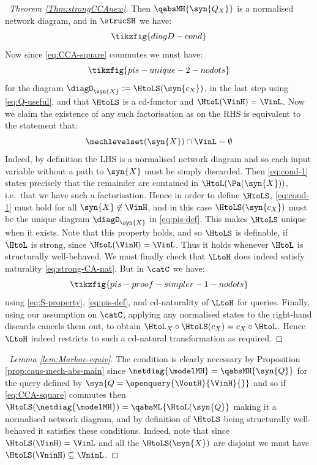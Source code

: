 \documentclass{article}
\begin{document}
{\begin{proof}[\proofof~Theorem \ref{Thm:strongCCAnew}]
Then $\qabsMH{\syn{Q_X}}$ is a normalised network diagram, and in $\strucSH$ we have: 
\begin{equation} \label{eq:S-property}
\tikzfig{diagD-cond}
\end{equation}
Now since \eqref{eq:CCA-square} commutes we must have: 
\begin{equation} \label{eq:pis-def}
\tikzfig{pis-unique-2-nodots}
\end{equation}
for the diagram $\diagD_\syn{X} := \HtoLS(\syn{c_X})$, in the last step using \eqref{eq:Q-useful}, and that $\HtoLS$ is a cd-functor and $\HtoL(\VinH) = \VinL$. Now we claim the existence of any such factorisation as on the RHS is equivalent to the statement that: 
\begin{equation} \label{eq:cond-1}
\mechlevelset(\syn{X}) \cap \VinL = \emptyset 
\end{equation}
Indeed, by definition the LHS is a normalised network diagram and so each input variable without a path to $\syn{X}$ must be simply discarded. Then \eqref{eq:cond-1} states precisely that the remainder are contained in $\HtoL(\Pa(\syn{X}))$, i.e.~that we have such a factorisation. Hence in order to define $\HtoLS$, \eqref{eq:cond-1} must hold for all $\syn{X} \not \in \VinH$, and in this case $\HtoLS(\syn{c_X})$ must be the unique diagram $\diagD_\syn{X}$ in \eqref{eq:pis-def}. This makes $\HtoLS$ unique when it exists. Note that this property holds, and so $\HtoLS$ is definable, if $\HtoL$ is strong, since $\HtoL(\VinH) = \VinL$. Thus it holds whenever $\HtoL$ is structurally well-behaved. We must finally check that $\LtoH$ does indeed satisfy naturality \eqref{eq:strong-CA-nat}. But in $\catC$ we have: 
\begin{align*}
\tikzfig{pis-proof-simpler-1-nodots}
\end{align*} 
using \eqref{eq:S-property}, \eqref{eq:pis-def}, and cd-naturality of $\LtoH$ for queries. Finally, using our assumption on $\catC$, applying any normalised states to the right-hand discards cancels them out, to obtain $\HtoL_X \circ \HtoLS(c_X) = c_X \circ \HtoL$. Hence $\LtoH$ indeed restricts to such a cd-natural transformation as required. 
\end{proof}



\begin{proof}[\proofof~Lemma \ref{lem:Markov-equiv}]
The condition is clearly necessary by Proposition \ref{prop:caus-mech-abs-main} since $\netdiag{\modelMH} = \qabsMH{\syn{Q}}$ for the query defined by $\syn{Q = \openquery{\VoutH}{\VinH}{}}$ and so if \eqref{eq:CCA-square} commutes then $\HtoLS(\netdiag{\modelMH}) = \qabsML{\HtoL(\syn{Q}}$ making it a normalised network diagram, and by definition of $\HtoLS$ being structurally well-behaved it satisfies these conditions. Indeed, note that since $\HtoLS(\VinH) = \VinL$ and all the $\HtoLS(\syn{X})$ are disjoint we must have $\HtoLS(\VninH) \subseteq \VninL$. 


\end{proof}}
\end{document}
